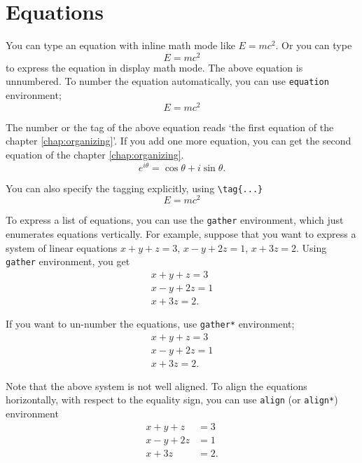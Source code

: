 \documentclass[11pt]{report}
\begin{document}
\section{Equations}\label{sec:equation}

You can type an equation with inline math mode like \(E=mc^2\). %
Or you can type
\[E=mc^2\]
to express the equation in display math mode.
The above equation is unnumbered.
To number the equation automatically, you can use \texttt{equation} environment;
\begin{equation}
E=mc^2
\end{equation}

The number or the tag of the above equation reads `the first equation of the chapter \ref{chap:organizing}'.
If you add one more equation, you can get the second equation of the chapter \ref{chap:organizing}.
\begin{equation}
e^{i\theta}=\cos\theta+i\sin\theta.
\end{equation}

You can also specify the tagging explicitly, using \verb|\tag{...}|
\[E=mc^2\tag{$*$}\]

To express a list of equations, you can use the \texttt{gather} environment, which just enumerates equations vertically.
For example, suppose that you want to express a system of linear equations \(x+y+z=3\), \(x-y+2z=1\), \(x+3z=2\).
Using \texttt{gather} environment, you get
\begin{gather}
x+y+z=3\\
x-y+2z=1\\
x+3z=2.
\end{gather}

If you want to un-number the equations, use \texttt{gather*} environment;
\begin{gather*}
x+y+z=3\\
x-y+2z=1\\
x+3z=2.
\end{gather*}

Note that the above system is not well aligned.
To align the equations horizontally, with respect to the equality sign, you can use \texttt{align} (or \texttt{align*}) environment
\begin{align*}
x+y+z&=3\\
x-y+2z&=1\\
x+3z&=2.
\end{align*}
\end{document}
